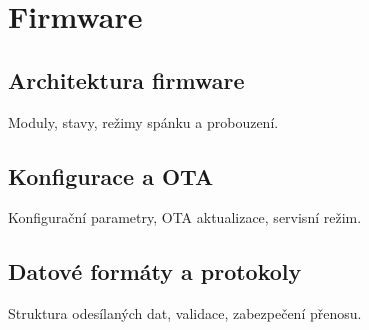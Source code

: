 \chapter{Firmware}
\label{chap:firmware}

\section{Architektura firmware}
Moduly, stavy, režimy spánku a probouzení.

\section{Konfigurace a OTA}
Konfigurační parametry, OTA aktualizace, servisní režim.

\section{Datové formáty a protokoly}
Struktura odesílaných dat, validace, zabezpečení přenosu.
